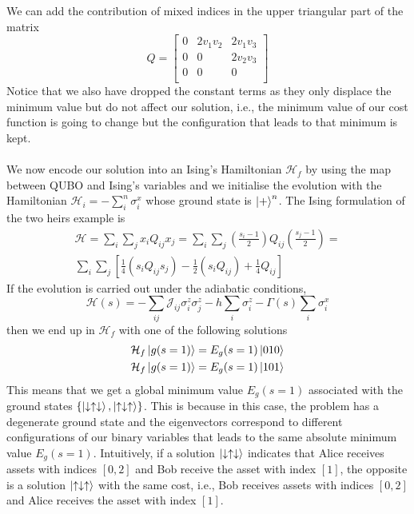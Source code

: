 We can add the contribution of mixed indices in the upper triangular part of the matrix
\begin{equation}
Q= 
    \begin{bmatrix}
           0 & 2v_{1}v_{2} & 2v_{1}v_{3}\\
           0 & 0 & 2v_{2}v_{3}\\
           0& 0 & 0\\
         \end{bmatrix}
\end{equation}
Notice that we also have dropped the constant terms as they only displace the minimum value but do not affect our solution, i.e., the minimum value of our cost function is going to change but the configuration that leads to that minimum is kept.\\\\
We now encode our solution into an Ising's Hamiltonian $\mathcal{H}_{f}$ by using the map between QUBO and Ising's variables and we initialise the evolution with the Hamiltonian $\mathcal{H}_{i} = -\sum_{i}^{n}\sigma_{i}^{x}$ whose ground state is $\ket{+}^{n}$. The  Ising formulation of the two heirs example is
\begin{align}
\mathcal{H} = \sum_{i}\sum_{j}x_{i}Q_{ij}x_{j} = \sum_{i}\sum_{j}\left( \frac{s_{i}-1}{2}\right)Q_{ij}\left(\frac{s_{j}-1}{2}\right) = \\
\sum_{i}\sum_{j}\left[\frac{1}{4}\left(s_{i}Q_{ij}s_{j}\right) - \frac{1}{2}\left(s_{i}Q_{ij}\right) + \frac{1}{4}Q_{ij}\right]
\end{align}
If the evolution is carried out under the adiabatic conditions,
\begin{equation}
    \mathcal{H}(s) = -\sum_{ij}\mathcal{J}_{ij}\sigma_{i}^{z}\sigma_{j}^{z} - h\sum_{i}\sigma_{i}^{z} - \Gamma(s)\sum_{i}\sigma_{i}^{x}
\end{equation}
then we end up in $\mathcal{H}_{f}$ with one of the following solutions
\begin{align}
    \mathcal{H}_{f}\ket{g(s=1)} = E_{g}(s=1)\ket{010} \\
    \mathcal{H}_{f}\ket{g(s=1)} = E_{g}(s=1)\ket{101}
\end{align}
This means that we get a global minimum value $E_{g}(s=1)$ associated with the ground states $\{\ket{\downarrow\uparrow\downarrow},\ket{\uparrow\downarrow\uparrow}\}$. This is because in this case, the problem has a degenerate ground state and the eigenvectors correspond to different configurations of our binary variables that leads to the same absolute minimum value $E_{g}(s=1)$. Intuitively, if a solution $\ket{\downarrow\uparrow\downarrow}$ indicates that Alice receives assets with indices $[0,2]$ and Bob receive the asset with index $[1]$, the opposite is a solution $\ket{\uparrow\downarrow\uparrow}$ with the same cost, i.e., Bob receives assets with indices $[0,2]$ and Alice receives the asset with index $[1]$.

